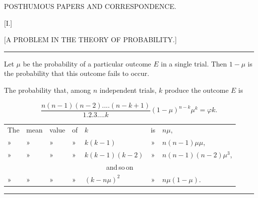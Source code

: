 \begin{center}
POSTHUMOUS PAPERS AND CORRESPONDENCE.
\end{center}

\begin{center}
[I.]
\end{center}

\begin{center}
[A PROBLEM IN THE THEORY OF PROBABILITY.]
\end{center}

\bigskip
\hrule
\bigskip

Let $\mu$ be the probability of a particular outcome $E$ in a
single trial. Then $1-\mu$ is the probability that this
outcome fails to occur.

The probability that, among $n$ independent trials, $k$
produce the outcome $E$ is

\[
\frac{n(n-1)(n-2)....(n-k+1)}{1.2.3....k}(1-\mu)^{n-k}\mu^k = \varphi k.
\]

\begin{center}
\small\setlength{\tabcolsep}{3pt}
\begin{tabular}{lllllcl}
The & mean & value & of & $k$ & is & $n\mu$, \\
» & » & » & » & $k(k-1)$ & » & $n(n-1)\mu\mu$, \\
» & » & » & » & $k(k-1)(k-2)$ & » & $n(n-1)(n-2)\mu^3$, \\
\multicolumn{7}{c}{and\,so\,on}\\
» & » & » & » & $(k-n\mu)^2$ & » & $n\mu(1-\mu)$. \\
\end{tabular}
\end{center}

\bigskip
\hrule
